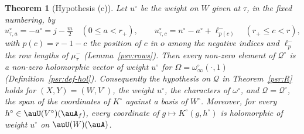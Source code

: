 \documentclass[10pt]{amsart}
\newtheorem{theorem}{Theorem}[section]
\theoremstyle{definition}
\theoremstyle{remark}
\begin{document}
\begin{theorem}[Hypothesis (c)]\label{psv:c}
Let $u^\circ$ be the weight on $W$ given at $\tau$, in the fixed numbering, by
\[
u^\circ_{\tau,a}=-a^\circ=j-\tfrac m2\quad(0\le a<r_+),\qquad u^\circ_{\tau,c}=n^\circ-a^\circ+\ell^-_{p(c)}
\quad(r_+\le c<r),
\]
with $p(c)=r-1-c$ the position of $c$ in $o$ among the negative indices and $\ell^-_p$ the row lengths of
$\mu^-_\tau$ \textup(Lemma~\ref{psv:rows}\textup). Then every non-zero element of $\mathcal Q^\circ$ is a non-zero
holomorphic vector of weight $u^\circ$ for $\Omega=\omega^\circ_\infty(\cdot,1)$
\textup(Definition~\ref{psr:def-hol}\textup). Consequently the hypothesis on $\mathcal Q$ in
Theorem~\ref{psr:R} holds for $(X,Y)=(W,V^\circ)$, the weight $u^\circ$, the characters of $\omega^\circ$, and
$\mathcal Q=\mathcal Q^\circ$, the span of the coordinates of $K^\circ$ against a basis of $W^\circ$. Moreover, for every
$h^\circ\in\auU(V^\circ)(\auA_f)$, every coordinate of $g\mapsto K^\circ(g,h^\circ)$ is holomorphic of weight
$u^\circ$ on $\auU(W)(\auA)$.
\end{theorem}
\end{document}

